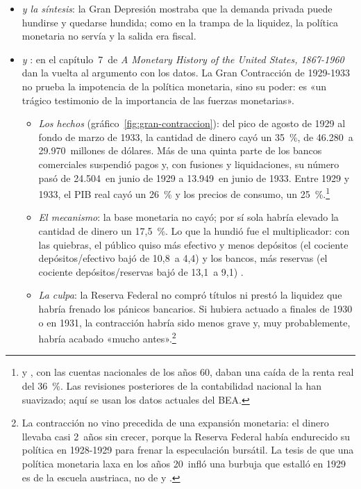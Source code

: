 \documentclass[11pt]{article}
\begin{document}
\begin{itemize}
\item \emph{ y la síntesis}: la Gran Depresión mostraba que la demanda privada puede hundirse y quedarse hundida; como en la trampa de la liquidez, la política monetaria no servía y la salida era fiscal.
\item \emph{ y }: en el capítulo~7~de \emph{A Monetary History of the United States, 1867-1960}\nocite{FriedmanSchwartz1963Monetary} dan la vuelta al argumento con los datos. La Gran Contracción de 1929-1933 no prueba la impotencia de la política monetaria, sino su poder: es «un trágico testimonio de la importancia de las fuerzas monetarias»\nocite{FriedmanSchwartz1965Great}.
  \begin{itemize}
  \item \emph{Los hechos} (gráfico~\ref{fig:gran-contraccion}): del pico de agosto de 1929 al fondo de marzo de 1933, la cantidad de dinero cayó un 35~\%, de 46.280~a 29.970~millones de dólares. Más de una quinta parte de los bancos comerciales suspendió pagos y, con fusiones y liquidaciones, su número pasó de 24.504~en junio de 1929 a 13.949~en junio de 1933\nocite{FriedmanSchwartz1963Monetary,FRED2026Bancos}. Entre 1929 y 1933, el PIB real cayó un 26~\% y los precios de consumo, un 25~\%\nocite{BEA2026NIPA,BLS2026IPC}.\footnote{ y , con las cuentas nacionales de los años 60, daban una caída de la renta real del 36~\%. Las revisiones posteriores de la contabilidad nacional la han suavizado; aquí se usan los datos actuales del BEA.}
  \item \emph{El mecanismo}: la base monetaria no cayó; por sí sola habría elevado la cantidad de dinero un 17,5~\%. Lo que la hundió fue el multiplicador: con las quiebras, el público quiso más efectivo y menos depósitos (el cociente depósitos/efectivo bajó de 10,8~a 4,4) y los bancos, más reservas (el cociente depósitos/reservas bajó de 13,1~a 9,1)\nocite{FriedmanSchwartz1965Great} .
  \item \emph{La culpa}: la Reserva Federal no compró títulos ni prestó la liquidez que habría frenado los pánicos bancarios. Si hubiera actuado a finales de 1930 o en 1931, la contracción habría sido menos grave y, muy probablemente, habría acabado «mucho antes»\nocite{FriedmanSchwartz1965Great}.\footnote{La contracción no vino precedida de una expansión monetaria: el dinero llevaba casi 2~años sin crecer, porque la Reserva Federal había endurecido su política en 1928-1929 para frenar la especulación bursátil\nocite{FriedmanSchwartz1965Great}. La tesis de que una política monetaria laxa en los años 20~infló una burbuja que estalló en 1929 es de la escuela austriaca\nocite{Rothbard1963America}, no de  y .}
  \end{itemize}
\end{itemize}
\end{document}
